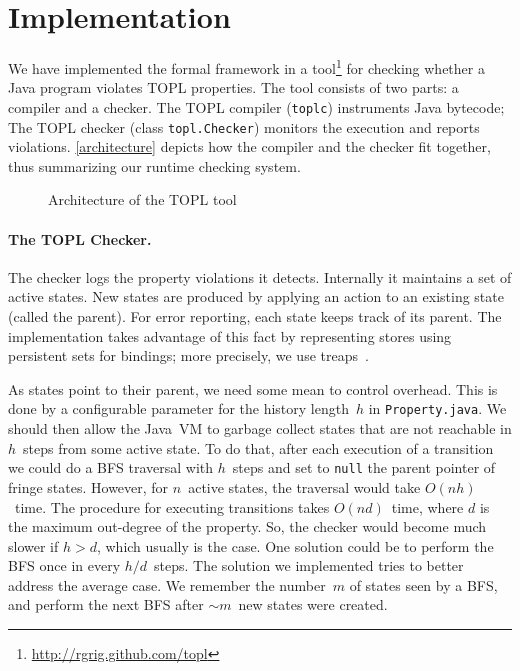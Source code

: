 \documentclass[9pt, preprint]{sigplanconf} %
\theoremstyle{definition}
\theoremstyle{remark}
\begin{document}
\section{Implementation} \label{sec:implementation} %
We have implemented the formal framework in a tool\footnote{\url{http://rgrig.github.com/topl}} for checking whether a Java program violates 
TOPL properties.
The tool consists of two parts: a compiler and a checker.
The TOPL compiler ({\tt toplc}) instruments Java bytecode;
The TOPL checker (class {\tt topl.Checker}) monitors the execution and reports violations.
\autoref{architecture} depicts how the compiler and the checker fit together, thus summarizing our runtime checking system.

\begin{figure}[t]
\begin{center}

\caption{Architecture of the TOPL tool}
\label{architecture}
\end{center}
\end{figure}

\paragraph{The TOPL Checker.} %
The checker logs the property violations it detects. 
Internally it  maintains a set of active states.
New states are  produced by applying an action to an existing state (called the parent).
For error reporting, each state keeps track of its parent.
The implementation takes advantage of this fact by representing stores
using persistent sets for bindings;  more precisely, we use treaps~\cite{DBLP:conf/focs/AragonS89}.

As states point to their parent, we need some mean to control overhead.  This is done by a configurable parameter for  the history length~$h$ in {\tt Property.java}.
We should then allow the Java~VM to garbage collect states that are not reachable in $h$~steps from some active state.
To do that, after each execution of a transition we could do a BFS traversal with $h$~steps and set to {\tt null} the parent pointer of fringe states.
However, for $n$~active states, the traversal would take $O(nh)$~time.
The procedure for executing transitions takes $O(nd)$~time, where $d$ is the maximum out-degree of the property.
So, the checker would become much slower if $h>d$, which usually is the case.
%
One solution could be to perform the BFS once in every $h/d$~steps.
The solution we implemented tries to better address the average case.
We remember the number~$m$ of states seen by a BFS, and perform the next BFS after $\sim m$~new states were created.
\end{document}
